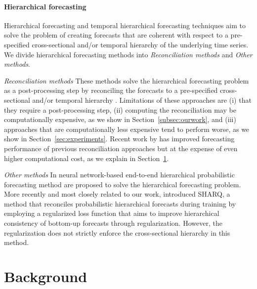 \documentclass[preprint, 3p, times, twocolumn]{elsarticle}
\begin{document}
\paragraph{Hierarchical forecasting} Hierarchical forecasting \cite{hyndman_optimal_2011, hyndman_fast_2016, taieb_coherent_2017, bentaieb_regularized_2019, wickramasuriya_optimal_2019} and temporal hierarchical forecasting techniques \cite{taieb_sparse_2017,athanasopoulos_forecasting_2017,rangapuram_coherent_2023,theodosiou_forecasting_2021} aim to solve the problem of creating forecasts that are coherent with respect to a pre-specified cross-sectional and/or temporal hierarchy of the underlying time series. We divide hierarchical forecasting methods into \textit{Reconciliation methods} and \textit{Other methods}.

\textit{Reconciliation methods} These methods solve the hierarchical forecasting problem as a post-processing step by reconciling the forecasts to a pre-specified cross-sectional and/or temporal hierarchy \cite{hyndman_optimal_2011, hyndman_fast_2016, taieb_coherent_2017, bentaieb_regularized_2019, wickramasuriya_optimal_2019, panagiotelis_forecast_2021, girolimetto_point_2023}. Limitations of these approaches are (i) that they require a post-processing step, (ii) computing the reconciliation may be computationally expensive, as we show in Section~\ref{subsec:ourwork}, and (iii) approaches that are computationally less expensive tend to perform worse, as we show in Section~\ref{sec:experiments}. Recent work by \citet{taieb_sparse_2017, bentaieb_regularized_2019} has improved forecasting performance of previous reconciliation approaches but at the expense of even higher computational cost, as we explain in Section~\ref{sec:background}.

\textit{Other methods} In \cite{rangapuram_endtoend_2021,rangapuram_coherent_2023} neural network-based end-to-end hierarchical probabilistic forecasting method are proposed to solve the hierarchical forecasting problem. More recently and most closely related to our work, \citet{han_simultaneously_2021} introduced SHARQ, a method that reconciles probabilistic hierarchical forecasts during training by employing a regularized loss function that aims to improve hierarchical consistency of bottom-up forecasts through regularization. However, the regularization does not strictly enforce the cross-sectional hierarchy in this method.

\section{Background} \label{sec:background}
\end{document}
